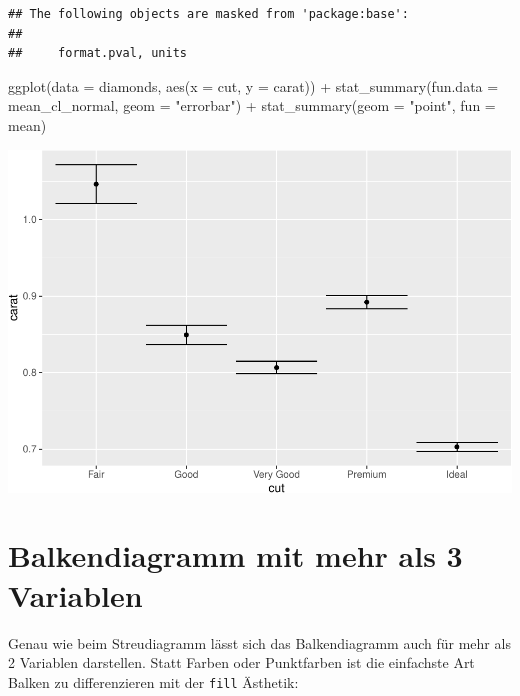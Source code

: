 \documentclass[
]{book}
\newenvironment{Shaded}{\begin{snugshade}}{\end{snugshade}}
\newcommand{\AttributeTok}[1]{\textcolor[rgb]{0.77,0.63,0.00}{#1}}
\newcommand{\FunctionTok}[1]{\textcolor[rgb]{0.00,0.00,0.00}{#1}}
\newcommand{\NormalTok}[1]{#1}
\newcommand{\SpecialCharTok}[1]{\textcolor[rgb]{0.00,0.00,0.00}{#1}}
\newcommand{\StringTok}[1]{\textcolor[rgb]{0.31,0.60,0.02}{#1}}
\begin{document}
\begin{verbatim}
## The following objects are masked from 'package:base':
## 
##     format.pval, units
\end{verbatim}

\begin{Shaded}
\begin{Highlighting}[]
\FunctionTok{ggplot}\NormalTok{(}\AttributeTok{data =}\NormalTok{ diamonds, }\FunctionTok{aes}\NormalTok{(}\AttributeTok{x =}\NormalTok{ cut, }\AttributeTok{y =}\NormalTok{ carat)) }\SpecialCharTok{+}
  \FunctionTok{stat\_summary}\NormalTok{(}\AttributeTok{fun.data =}\NormalTok{ mean\_cl\_normal,  }\AttributeTok{geom =} \StringTok{"errorbar"}\NormalTok{) }\SpecialCharTok{+}
  \FunctionTok{stat\_summary}\NormalTok{(}\AttributeTok{geom =} \StringTok{"point"}\NormalTok{, }\AttributeTok{fun =}\NormalTok{ mean) }
\end{Highlighting}
\end{Shaded}

\includegraphics{CFH_R_bookdown_files/figure-latex/unnamed-chunk-167-1.pdf}

\hypertarget{balkendiagramm-mit-mehr-als-3-variablen}{%
\section{Balkendiagramm mit mehr als 3 Variablen}\label{balkendiagramm-mit-mehr-als-3-variablen}}

Genau wie beim Streudiagramm lässt sich das Balkendiagramm auch für mehr als 2 Variablen darstellen. Statt Farben oder Punktfarben ist die einfachste Art Balken zu differenzieren mit der \texttt{fill} Ästhetik:
\end{document}
